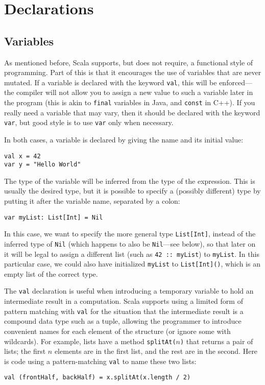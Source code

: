 \documentclass[11pt]{article}
\begin{document}
\section{Declarations}
\subsection{Variables}
As mentioned before, Scala supports, but does not require, a functional style of programming. Part of this is that it encourages the use of variables that are never mutated. If a variable is declared with the keyword \texttt{val}, this will be enforced---the compiler will not allow you to assign a new value to such a variable later in the program (this is akin to \texttt{final} variables in Java, and \texttt{const} in C++). If you really need a variable that may vary, then it should be declared with the keyword \texttt{var}, but good style is to use \texttt{var} only when necessary.

In both cases, a variable is declared by giving the name and its initial value:
\begin{verbatim}
val x = 42
var y = "Hello World"
\end{verbatim}
The type of the variable will be inferred from the type of the expression. This is usually the desired type, but it is possible to specify a (possibly different) type by putting it after the variable name, separated by a colon:
\begin{verbatim}
var myList: List[Int] = Nil
\end{verbatim}
In this case, we want to specify the more general type \texttt{List[Int]}, instead of the inferred type of \texttt{Nil} (which happens to also be \texttt{Nil}---see below), so that later on it will be legal to assign a different list (such as \verb|42 :: myList|) to \texttt{myList}. In this particular case, we could also have initialized \texttt{myList} to \texttt{List[Int]()}, which is an empty list of the correct type.

The \texttt{val} declaration is useful when introducing a temporary variable to hold an intermediate result in a computation. Scala supports using a limited form of pattern matching with \texttt{val} for the situation that the intermediate result is a compound data type such as a tuple, allowing the programmer to introduce convenient names for each element of the structure (or ignore some with wildcards). For example, lists have a method \texttt{splitAt($n$)} that returns a pair of lists; the first $n$ elements are in the first list, and the rest are in the second. Here is code using a pattern-matching \texttt{val} to name these two lists:
\begin{verbatim}
val (frontHalf, backHalf) = x.splitAt(x.length / 2)
\end{verbatim}
\end{document}
